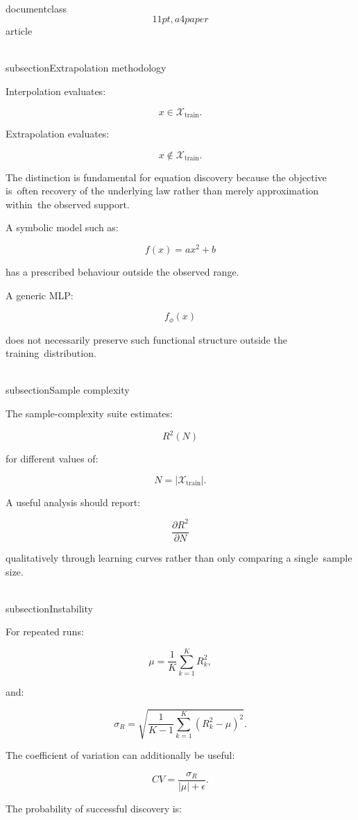 \\documentclass\[11pt,a4paper\]{article}
\begin{document}
 \\subsection{Extrapolation methodology}

 Interpolation evaluates:

 $$
x\in\mathcal X_{\mathrm{train}}.
$$

 Extrapolation evaluates:

 $$
x\notin\mathcal X_{\mathrm{train}}.
$$

 The distinction is fundamental for equation discovery because the objective is\
 often recovery of the underlying law rather than merely approximation within\
 the observed support.

 A symbolic model such as:

 $$
f(x)=ax^2+b
$$

 has a prescribed behaviour outside the observed range.

 A generic MLP:

 $$
f_\phi(x)
$$

 does not necessarily preserve such functional structure outside the training\
 distribution.

 \\subsection{Sample complexity}

 The sample-complexity suite estimates:

 $$
R^2(N)
$$

 for different values of:

 $$
N=|\mathcal X_{\mathrm{train}}|.
$$

 A useful analysis should report:

 $$
\frac{\partial R^2}{\partial N}
$$

 qualitatively through learning curves rather than only comparing a single\
 sample size.

 \\subsection{Instability}

 For repeated runs:

 $$
\mu=
\frac{1}{K}\sum_{k=1}^K R_k^2,
$$

 and:

 $$
\sigma_R=
\sqrt{
\frac{1}{K-1}
\sum_{k=1}^K
(R_k^2-\mu)^2
}.
$$

 The coefficient of variation can additionally be useful:

 $$
CV=
\frac{\sigma_R}{|\mu|+\epsilon}.
$$

 The probability of successful discovery is:
\end{document}
